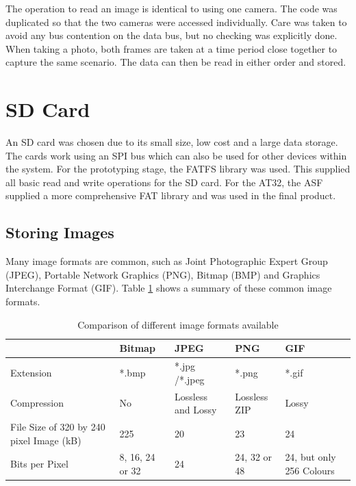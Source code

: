The operation to read an image is identical to using one camera. The code was duplicated so that the two cameras were accessed individually. Care was taken to avoid any bus contention on the data bus, but no checking was explicitly done. When taking a photo, both frames are taken at a time period close together to capture the same scenario. The data can then be read in either order and stored.

\section{SD Card} \label{sect:SDCard}

An SD card was chosen due to its small size, low cost and a large data storage. 
The cards work using an SPI bus which can also be used for other devices within the system. For the prototyping stage, the FATFS library \citep{FATFS} was used. This supplied all basic read and write operations for the SD card. For the AT32, the ASF supplied a more comprehensive FAT library and was used in the final product.

\subsection{Storing Images}

Many image formats are common, such as Joint Photographic Expert Group (JPEG), Portable Network Graphics (PNG), Bitmap (BMP) and Graphics Interchange Format (GIF). Table \ref{ImageFormats} shows a summary of these common image formats.


\begin{table}
\centering
\caption{Comparison of different image formats available \citep{ImageComparison}}
\label{ImageFormats}
\begin{tabular}{p{3cm}p{2cm}p{2cm}p{2cm}p{2cm}} \toprule
			&	\textbf{Bitmap} 		& 	\textbf{JPEG}			 	&	\textbf{PNG}				& 	\textbf{GIF} \\ \toprule
Extension 		& 	*.bmp 		&  	*.jpg /*.jpeg 		& 	*.png				& 	*.gif \\ \midrule
Compression 	& 	No 			& 	Lossless  and Lossy		&	Lossless ZIP			&	Lossy	\\ \midrule
File Size of 320 by 
240 pixel Image (kB) &	225			&	20				&	23				&	24 \\ \midrule
Bits per Pixel		&	8, 16, 24 or 32	&	24				&	24, 32 or 48 			& 	24, but only 256 Colours \\ \bottomrule
\end{tabular}
\end{table}

